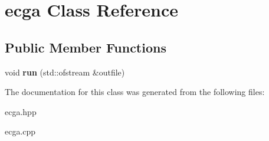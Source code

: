 \hypertarget{classecga}{\section{ecga \-Class \-Reference}
\label{classecga}
}
\subsection*{\-Public \-Member \-Functions}
\begin{DoxyCompactItemize}
\item 
\hypertarget{classecga_acadcd198055c7233290c19d5b74b1689}{void {\bfseries run} (std\-::ofstream \&outfile)}\label{classecga_acadcd198055c7233290c19d5b74b1689}

\end{DoxyCompactItemize}


\-The documentation for this class was generated from the following files\-:\begin{DoxyCompactItemize}
\item 
ecga.\-hpp\item 
ecga.\-cpp\end{DoxyCompactItemize}
